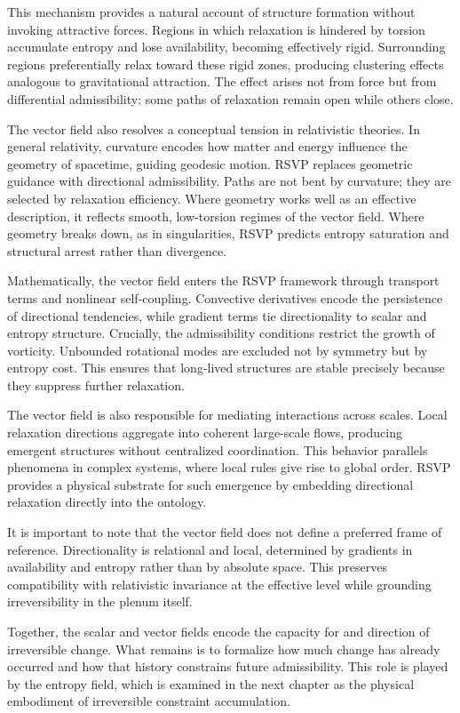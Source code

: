 \documentclass[11pt,oneside]{book}
\begin{document}
This mechanism provides a natural account of structure formation without invoking attractive forces. Regions in which relaxation is hindered by torsion accumulate entropy and lose availability, becoming effectively rigid. Surrounding regions preferentially relax toward these rigid zones, producing clustering effects analogous to gravitational attraction. The effect arises not from force but from differential admissibility: some paths of relaxation remain open while others close.

The vector field also resolves a conceptual tension in relativistic theories. In general relativity, curvature encodes how matter and energy influence the geometry of spacetime, guiding geodesic motion. RSVP replaces geometric guidance with directional admissibility. Paths are not bent by curvature; they are selected by relaxation efficiency. Where geometry works well as an effective description, it reflects smooth, low-torsion regimes of the vector field. Where geometry breaks down, as in singularities, RSVP predicts entropy saturation and structural arrest rather than divergence.

Mathematically, the vector field enters the RSVP framework through transport terms and nonlinear self-coupling. Convective derivatives encode the persistence of directional tendencies, while gradient terms tie directionality to scalar and entropy structure. Crucially, the admissibility conditions restrict the growth of vorticity. Unbounded rotational modes are excluded not by symmetry but by entropy cost. This ensures that long-lived structures are stable precisely because they suppress further relaxation.

The vector field is also responsible for mediating interactions across scales. Local relaxation directions aggregate into coherent large-scale flows, producing emergent structures without centralized coordination. This behavior parallels phenomena in complex systems, where local rules give rise to global order. RSVP provides a physical substrate for such emergence by embedding directional relaxation directly into the ontology.

It is important to note that the vector field does not define a preferred frame of reference. Directionality is relational and local, determined by gradients in availability and entropy rather than by absolute space. This preserves compatibility with relativistic invariance at the effective level while grounding irreversibility in the plenum itself.

Together, the scalar and vector fields encode the capacity for and direction of irreversible change. What remains is to formalize how much change has already occurred and how that history constrains future admissibility. This role is played by the entropy field, which is examined in the next chapter as the physical embodiment of irreversible constraint accumulation.
\end{document}
